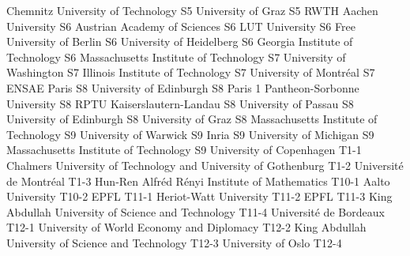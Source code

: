 \begin{multicols}{2}
{}
{Chemnitz University of Technology}
{S5}
{}
{University of Graz}
{S5}
{}
{RWTH Aachen University}
{S6}
{}
{Austrian Academy of Sciences}
{S6}
{}
{LUT University}
{S6}
{}
{Free University of Berlin}
{S6}
{}
{University of Heidelberg}
{S6}
{}
{Georgia Institute of Technology}
{S6}
{}
{Massachusetts Institute of Technology}
{S7}
{}
{University of Washington}
{S7}
{}
{Illinois Institute of Technology}
{S7}
{}
{University of Montréal}
{S7}
{}
{ENSAE Paris}
{S8}
{}
{University of Edinburgh}
{S8}
{}
{Paris 1 Pantheon-Sorbonne University}
{S8}
{}
{RPTU Kaiserslautern-Landau}
{S8}
{}
{University of Passau}
{S8}
{}
{University of Edinburgh}
{S8}
{}
{University of Graz}
{S8}
{}
{Massachusetts Institute of Technology}
{S9}
{}
{University of Warwick}
{S9}
{}
{Inria}
{S9}
{}
{University of Michigan}
{S9}
{}
{Massachusetts Institute of Technology}
{S9}
{}
{University of Copenhagen}
{T1-1}
{}
{Chalmers University of Technology and University of Gothenburg}
{T1-2}
{}
{Université de Montréal}
{T1-3}
{}
{Hun-Ren Alfréd Rényi Institute of Mathematics}
{T10-1}
{}
{Aalto University}
{T10-2}
{}
{EPFL}
{T11-1}
{}
{Heriot-Watt University}
{T11-2}
{}
{EPFL}
{T11-3}
{}
{King Abdullah University of Science and Technology}
{T11-4}
{}
{Université de Bordeaux}
{T12-1}
{}
{University of World Economy and Diplomacy}
{T12-2}
{}
{King Abdullah University of Science and Technology}
{T12-3}
{}
{University of Oslo}
{T12-4}
{}

\end{multicols}
